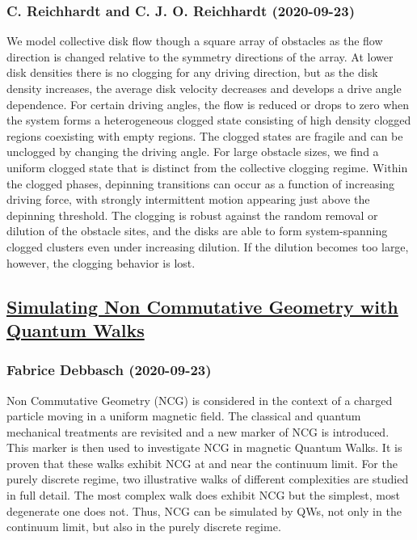 \subsubsection*{C. Reichhardt and C. J. O. Reichhardt (2020-09-23)}
We model collective disk flow though a square array of obstacles as the flow
direction is changed relative to the symmetry directions of the array. At lower
disk densities there is no clogging for any driving direction, but as the disk
density increases, the average disk velocity decreases and develops a drive
angle dependence. For certain driving angles, the flow is reduced or drops to
zero when the system forms a heterogeneous clogged state consisting of high
density clogged regions coexisting with empty regions. The clogged states are
fragile and can be unclogged by changing the driving angle. For large obstacle
sizes, we find a uniform clogged state that is distinct from the collective
clogging regime. Within the clogged phases, depinning transitions can occur as
a function of increasing driving force, with strongly intermittent motion
appearing just above the depinning threshold. The clogging is robust against
the random removal or dilution of the obstacle sites, and the disks are able to
form system-spanning clogged clusters even under increasing dilution. If the
dilution becomes too large, however, the clogging behavior is lost.

\subsection*{\href{http://arxiv.org/abs/2009.11371v1}{Simulating Non Commutative Geometry with Quantum Walks}}
\subsubsection*{Fabrice Debbasch (2020-09-23)}
Non Commutative Geometry (NCG) is considered in the context of a charged
particle moving in a uniform magnetic field. The classical and quantum
mechanical treatments are revisited and a new marker of NCG is introduced. This
marker is then used to investigate NCG in magnetic Quantum Walks. It is proven
that these walks exhibit NCG at and near the continuum limit. For the purely
discrete regime, two illustrative walks of different complexities are studied
in full detail. The most complex walk does exhibit NCG but the simplest, most
degenerate one does not. Thus, NCG can be simulated by QWs, not only in the
continuum limit, but also in the purely discrete regime.

